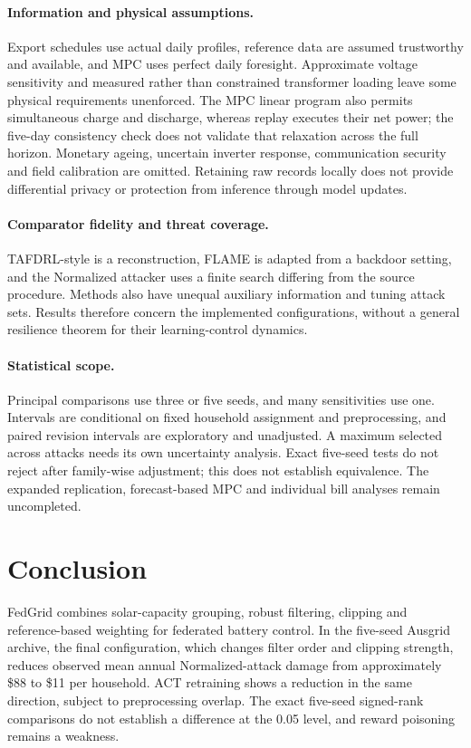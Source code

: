 \documentclass[preprint,12pt,a4paper]{elsarticle}
\begin{document}
\paragraph{Information and physical assumptions.}
Export schedules use actual daily profiles, reference data are assumed trustworthy and available, and MPC uses perfect daily foresight. Approximate voltage sensitivity and measured rather than constrained transformer loading leave some physical requirements unenforced. The MPC linear program also permits simultaneous charge and discharge, whereas replay executes their net power; the five-day consistency check does not validate that relaxation across the full horizon. Monetary ageing, uncertain inverter response, communication security and field calibration are omitted. Retaining raw records locally does not provide differential privacy or protection from inference through model updates.

\paragraph{Comparator fidelity and threat coverage.}
TAFDRL-style is a reconstruction, FLAME is adapted from a backdoor setting, and the Normalized attacker uses a finite search differing from the source procedure. Methods also have unequal auxiliary information and tuning attack sets. Results therefore concern the implemented configurations, without a general resilience theorem for their learning-control dynamics.

\paragraph{Statistical scope.}
Principal comparisons use three or five seeds, and many sensitivities use one. Intervals are conditional on fixed household assignment and preprocessing, and paired revision intervals are exploratory and unadjusted. A maximum selected across attacks needs its own uncertainty analysis. Exact five-seed tests do not reject after family-wise adjustment; this does not establish equivalence. The expanded replication, forecast-based MPC and individual bill analyses remain uncompleted.



\section{Conclusion}
FedGrid combines solar-capacity grouping, robust filtering, clipping and reference-based weighting for federated battery control. In the five-seed Ausgrid archive, the final configuration, which changes filter order and clipping strength, reduces observed mean annual Normalized-attack damage from approximately \$88 to \$11 per household. ACT retraining shows a reduction in the same direction, subject to preprocessing overlap. The exact five-seed signed-rank comparisons do not establish a difference at the 0.05 level, and reward poisoning remains a weakness.
\end{document}
